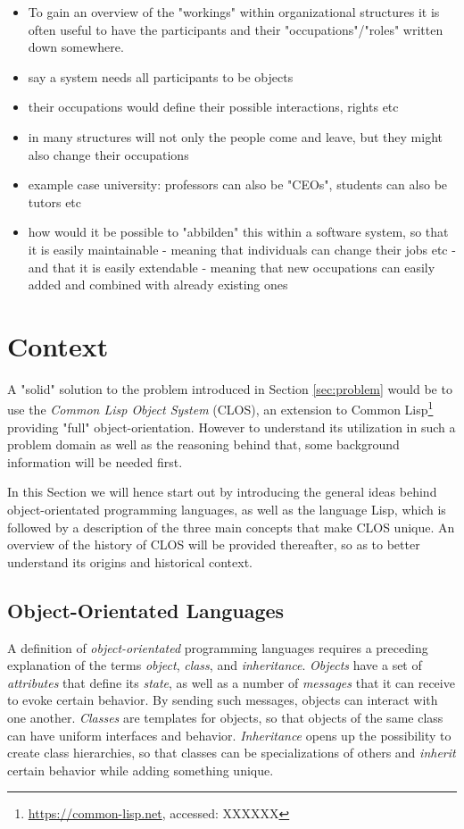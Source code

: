 \documentclass[oribibl]{llncs}
\begin{document}
\begin{itemize}
\item To gain an overview of the "workings" within organizational structures it is often useful to have the participants and their "occupations"/"roles" written down somewhere. 
\item say a system needs all participants to be objects
\item their occupations would define their possible interactions, rights etc
\item in many structures will not only the people come and leave, but they might also change their occupations
\item example case university: professors can also be "CEOs", students can also be tutors etc
\item how would it be possible to "abbilden" this within a software system, so that it is easily maintainable - meaning that individuals can change their jobs etc - and that it is easily extendable - meaning that new occupations can easily added and combined with already existing ones
\end{itemize}


\section{Context}
\label{sec:context}
A "solid" solution to the problem introduced in Section \ref{sec:problem} would be to use the \emph{Common Lisp Object System} (CLOS), an extension to Common Lisp\footnote{\url{https://common-lisp.net}, accessed: XXXXXX} providing "full" object-orientation. \cite{CLOSOverview} However to understand its utilization in such a problem domain as well as the reasoning behind that, some background information will be needed first.

In this Section we will hence start out by introducing the general ideas behind object-orientated programming languages, as well as the language Lisp, which is followed by a description of the three main concepts that make CLOS unique. An overview of the history of CLOS will be provided thereafter, so as to better understand its origins and historical context.

\subsection{Object-Orientated Languages}
\label{sec:oo}

A definition of \emph{object-orientated} programming languages requires a preceding explanation of the terms \emph{object}, \emph{class}, and \emph{inheritance}. \emph{Objects} have a set of \emph{attributes} that define its \emph{state}, as well as a number of \emph{messages} that it can receive to evoke certain behavior. By sending such messages, objects can interact with one another. \emph{Classes} are templates for objects, so that objects of the same class can have uniform interfaces and behavior. \emph{Inheritance} opens up the possibility to create class hierarchies, so that classes can be specializations of others and \emph{inherit} certain behavior while adding something unique. 
\end{document}
